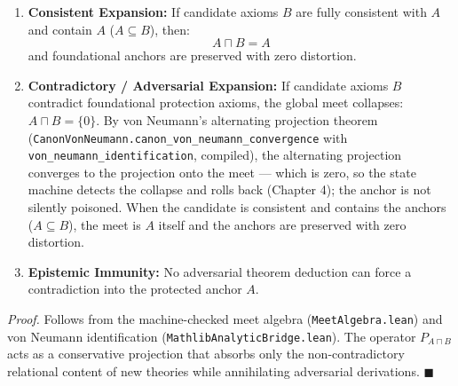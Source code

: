 \documentclass[
]{article}
\providecommand{\tightlist}{%
  \setlength{\itemsep}{0pt}\setlength{\parskip}{0pt}}
\begin{document}
\begin{enumerate}
\def\labelenumi{\arabic{enumi}.}
\tightlist
\item
  \textbf{Consistent Expansion:} If candidate axioms \(B\) are fully
  consistent with \(A\) and contain \(A\) (\(A \subseteq B\)), then:
  \[A \sqcap B = A\] and foundational anchors are preserved with zero
  distortion.
\item
  \textbf{Contradictory / Adversarial Expansion:} If candidate axioms
  \(B\) contradict foundational protection axioms, the global meet
  collapses: \(A \sqcap B = \{0\}\). By von Neumann's alternating
  projection theorem
  (\texttt{C\allowbreak{}a\allowbreak{}n\allowbreak{}o\allowbreak{}n\allowbreak{}V\allowbreak{}o\allowbreak{}n\allowbreak{}N\allowbreak{}e\allowbreak{}u\allowbreak{}m\allowbreak{}a\allowbreak{}n\allowbreak{}n\allowbreak{}.\allowbreak{}c\allowbreak{}a\allowbreak{}n\allowbreak{}o\allowbreak{}n\allowbreak{}\_\allowbreak{}v\allowbreak{}o\allowbreak{}n\allowbreak{}\_\allowbreak{}n\allowbreak{}e\allowbreak{}u\allowbreak{}m\allowbreak{}a\allowbreak{}n\allowbreak{}n\allowbreak{}\_\allowbreak{}c\allowbreak{}o\allowbreak{}n\allowbreak{}v\allowbreak{}e\allowbreak{}r\allowbreak{}g\allowbreak{}e\allowbreak{}n\allowbreak{}c\allowbreak{}e}
  with
  \texttt{v\allowbreak{}o\allowbreak{}n\allowbreak{}\_\allowbreak{}n\allowbreak{}e\allowbreak{}u\allowbreak{}m\allowbreak{}a\allowbreak{}n\allowbreak{}n\allowbreak{}\_\allowbreak{}i\allowbreak{}d\allowbreak{}e\allowbreak{}n\allowbreak{}t\allowbreak{}i\allowbreak{}f\allowbreak{}i\allowbreak{}c\allowbreak{}a\allowbreak{}t\allowbreak{}i\allowbreak{}o\allowbreak{}n},
  compiled), the alternating projection converges to the projection onto
  the meet --- which is zero, so the state machine detects the collapse
  and rolls back (Chapter 4); the anchor is not silently poisoned. When
  the candidate is consistent and contains the anchors
  (\(A \subseteq B\)), the meet is \(A\) itself and the anchors are
  preserved with zero distortion.
\item
  \textbf{Epistemic Immunity:} No adversarial theorem deduction can
  force a contradiction into the protected anchor \(A\).
\end{enumerate}

\emph{Proof.} Follows from the machine-checked meet algebra
(\texttt{MeetAlgebra.lean}) and von Neumann identification
(\texttt{M\allowbreak{}a\allowbreak{}t\allowbreak{}h\allowbreak{}l\allowbreak{}i\allowbreak{}b\allowbreak{}A\allowbreak{}n\allowbreak{}a\allowbreak{}l\allowbreak{}y\allowbreak{}t\allowbreak{}i\allowbreak{}c\allowbreak{}B\allowbreak{}r\allowbreak{}i\allowbreak{}d\allowbreak{}g\allowbreak{}e\allowbreak{}.\allowbreak{}l\allowbreak{}e\allowbreak{}a\allowbreak{}n}).
The operator \(P_{A \sqcap B}\) acts as a conservative projection that
absorbs only the non-contradictory relational content of new theories
while annihilating adversarial derivations. \(\blacksquare\)
\end{document}
